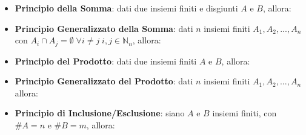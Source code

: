 \begin{itemize}[nosep]
    \item \textbf{Principio della Somma}: dati due insiemi finiti e disgiunti $A$ e $B$, allora: 
    \item \textbf{Principio Generalizzato della Somma}: dati $n$ insiemi finiti $A_1, A_2, ..., A_n$ con $A_i \cap A_j = \emptyset \; \forall i \neq j \; i,j \in \mathbb{N}_n$, allora: 
    \item \textbf{Principio del Prodotto}: dati due insiemi finiti $A$ e $B$, allora: 
    \item \textbf{Principio Generalizzato del Prodotto}: dati $n$ insiemi finiti $A_1, A_2, ..., A_n$ allora: \\
    \item \textbf{Principio di Inclusione/Esclusione}: siano $A$ e $B$ insiemi finiti, con $\# A = n$ e $\# B = m$, allora: 


\end{itemize}
